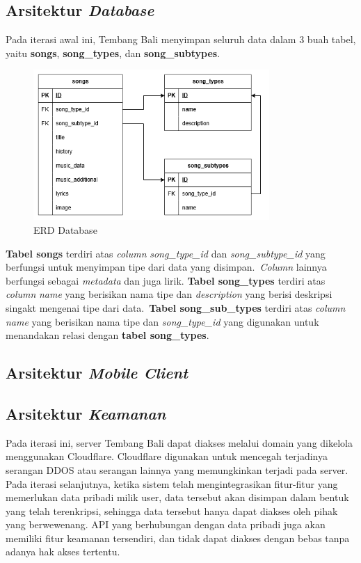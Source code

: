 \documentclass[a4paper, 12pt]{article}
\begin{document}
\subsection{Arsitektur \textit{Database}}
Pada iterasi awal ini, Tembang Bali menyimpan seluruh data dalam 3 buah tabel, yaitu \textbf{songs}, \textbf{song\_types}, dan \textbf{song\_subtypes}.

\begin{figure}[H]
    \centering
    \includegraphics[width=0.8\textwidth]{assets/erd.png}
    \caption{ERD Database}
\end{figure}

\textbf{Tabel songs} terdiri atas \textit{column} \textit{song\_type\_id} dan \textit{song\_subtype\_id} yang berfungsi untuk menyimpan tipe dari data yang disimpan.\
\textit{Column} lainnya berfungsi sebagai \textit{metadata} dan juga lirik.
\textbf{Tabel song\_types} terdiri atas \textit{column} \textit{name} yang berisikan nama tipe dan \textit{description} yang berisi deskripsi singakt mengenai tipe dari data.\
\textbf{Tabel song\_sub\_types} terdiri atas \textit{column} \textit{name} yang berisikan nama tipe dan \textit{song\_type\_id} yang digunakan untuk menandakan relasi dengan \textbf{tabel song\_types}.\

\subsection{Arsitektur \textit{Mobile Client}}

\subsection{Arsitektur \textit{Keamanan}}
Pada iterasi ini, server Tembang Bali dapat diakses melalui domain yang dikelola menggunakan Cloudflare. Cloudflare digunakan untuk mencegah terjadinya serangan DDOS atau serangan lainnya yang memungkinkan terjadi pada server.
Pada iterasi selanjutnya, ketika sistem telah mengintegrasikan fitur-fitur yang memerlukan data pribadi milik user, data tersebut akan disimpan dalam bentuk yang telah terenkripsi, sehingga data tersebut hanya dapat diakses oleh pihak yang berwewenang.
API yang berhubungan dengan data pribadi juga akan memiliki fitur keamanan tersendiri, dan tidak dapat diakses dengan bebas tanpa adanya hak akses tertentu.
\end{document}
